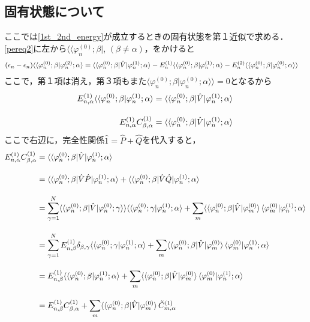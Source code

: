 \subsection{固有状態について}
ここでは\eqref{1st_2nd_energy}が成立するときの固有状態を第１近似で求める．\eqref{pereq2}に左から$\langle\langle\varphi^{(0)}_{n};\beta|$, $(\beta\neq\alpha)$，をかけると
\begin{align}
    (\epsilon_n-\epsilon_n)\langle\braket{\varphi^{(0)}_{n};\beta|\varphi^{(2)}_n;\alpha}
    &=\langle\braket{\varphi^{(0)}_{n};\beta|\hat{V}|\varphi^{(1)}_n;\alpha}
    -E^{(1)}_n\langle\braket{\varphi^{(0)}_{n};\beta|\varphi^{(1)}_n;\alpha}
    -E^{(2)}_n\langle\langle\varphi^{(0)}_{n};\beta|\varphi^{(0)}_n;\alpha\rangle\rangle
\end{align}
ここで，第１項は消え，第３項もまた$\langle\varphi^{(0)}_{n};\beta|\varphi^{(0)}_n;\alpha\rangle\rangle=0$となるから
\begin{align}
    E^{(1)}_{n,\alpha}\langle\braket{\varphi^{(0)}_{n};\beta|\varphi^{(1)}_n;\alpha}
    &=\langle\braket{\varphi^{(0)}_{n};\beta|\hat{V}|\varphi^{(1)}_n;\alpha}\\[10pt]
    E^{(1)}_{n,\alpha}C^{(1)}_{\beta,\alpha}
    &=\langle\braket{\varphi^{(0)}_{n};\beta|\hat{V}|\varphi^{(1)}_n;\alpha}
\end{align}
ここで右辺に，完全性関係$\hat{1}=\hat{P}+\hat{Q}$を代入すると，
\begin{align}
    E^{(1)}_{n,\alpha}C^{(1)}_{\beta,\alpha}
    &=\langle\braket{\varphi^{(0)}_{n};\beta|\hat{V}|\varphi^{(1)}_n;\alpha}\nn[10pt]
    &=\langle\braket{\varphi^{(0)}_{n};\beta|\hat{V}\hat{P}|\varphi^{(1)}_n;\alpha}
    +\langle\braket{\varphi^{(0)}_{n};\beta|\hat{V}\hat{Q}|\varphi^{(1)}_n;\alpha}\nn[10pt]
    &=\sum_{\gamma=1}^{N}\langle\braket{\varphi^{(0)}_{n};\beta|\hat{V}|\varphi^{(0)}_n;\gamma}\rangle
    \langle\braket{\varphi^{(0)}_{n};\gamma|\varphi^{(1)}_n;\alpha}
    +\sum_{m}\langle\braket{\varphi^{(0)}_{n};\beta|\hat{V}|\varphi^{(0)}_m}
    \braket{\varphi^{(0)}_{m}|\varphi^{(1)}_n;\alpha}\nn[10pt]
    &=\sum_{\gamma=1}^{N}E^{(1)}_{n,\beta}\delta_{\beta,\gamma}
    \langle\braket{\varphi^{(0)}_{n};\gamma|\varphi^{(1)}_n;\alpha}
    +\sum_{m}\langle\braket{\varphi^{(0)}_{n};\beta|\hat{V}|\varphi^{(0)}_m}
    \braket{\varphi^{(0)}_{m}|\varphi^{(1)}_n;\alpha}\nn[10pt]
    &=E^{(1)}_{n,\beta}
    \langle\braket{\varphi^{(0)}_{n};\beta|\varphi^{(1)}_n;\alpha}
    +\sum_{m}\langle\braket{\varphi^{(0)}_{n};\beta|\hat{V}|\varphi^{(0)}_m}
    \braket{\varphi^{(0)}_{m}|\varphi^{(1)}_n;\alpha}\nn[10pt]
    &=E^{(1)}_{n,\beta}
    C^{(1)}_{\beta,\alpha}
    +\sum_{m}\langle\braket{\varphi^{(0)}_{n};\beta|\hat{V}|\varphi^{(0)}_m}
    \Tilde{C}^{(1)}_{m,\alpha}
\end{align}
